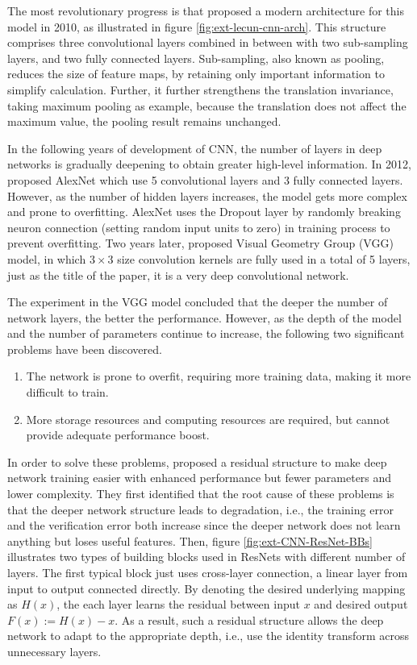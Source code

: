 The most revolutionary progress is that \citet{lecun2010convolutional} proposed a modern architecture for this model in 2010, as illustrated in figure \ref{fig:ext-lecun-cnn-arch}.
This structure comprises three convolutional layers combined in between with two sub-sampling layers, and two fully connected layers. Sub-sampling, also known as pooling, reduces the size of feature maps, by retaining only important information to simplify calculation.
Further, it further strengthens the translation invariance, taking maximum pooling as example, because the translation does not affect the maximum value, the pooling result remains unchanged.

In the following years of development of CNN, the number of layers in deep networks is gradually deepening to obtain greater high-level information.
In 2012, \citet{krizhevsky2012imagenet} proposed AlexNet which use 5 convolutional layers and 3 fully connected layers.
However, as the number of hidden layers increases, the model gets more complex and prone to overfitting.
AlexNet uses the Dropout layer by randomly breaking neuron connection (setting random input units to zero) in training process to prevent overfitting. 
Two years later, \citet{simonyan2014very} proposed Visual Geometry Group (VGG) model, in which $3\times3$ size convolution kernels are fully used in a total of 5 layers, just as the title of the paper, it is a very deep convolutional network.

The experiment in the VGG model concluded that the deeper the number of network layers, the better the performance.
However, as the depth of the model and the number of parameters continue to increase, the following two significant problems have been discovered.

\begin{enumerate}
    \item The network is prone to overfit, requiring more training data, making it more difficult to train.
    \item More storage resources and computing resources are required, but cannot provide adequate performance boost. 
\end{enumerate}

In order to solve these problems, \citet{he2015deep} proposed a residual structure to make deep network training easier with enhanced performance but fewer parameters and lower complexity. 
They first identified that the root cause of these problems is that the deeper network structure leads to degradation, i.e., the training error and the verification error both increase since the deeper network does not learn anything but loses useful features.
Then, figure \ref{fig:ext-CNN-ResNet-BBs} illustrates two types of building blocks used in ResNets with different number of layers.
The first typical block just uses cross-layer connection, a linear layer from input to output connected directly.
By denoting the desired underlying mapping as $H(x)$, the each layer learns the residual between input $x$ and desired output $F(x):=H(x)-x$.
As a result, such a residual structure allows the deep network to adapt to the appropriate depth, i.e., use the identity transform across unnecessary layers.

